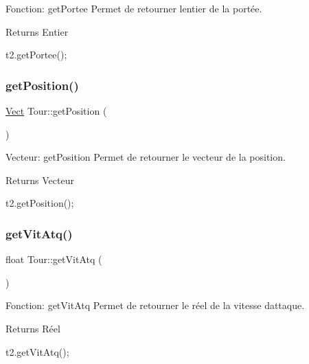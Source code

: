 Fonction\+: get\+Portee Permet de retourner l\textquotesingle{}entier de la portée. 

\begin{DoxyReturn}{Returns}
Entier 
\begin{DoxyCode}
t2.getPortee();
\end{DoxyCode}
 
\end{DoxyReturn}
\mbox{\label{classTour_a2283f61d6b088bf41c53c882f4a72864}} 
\subsubsection{\texorpdfstring{get\+Position()}{getPosition()}}
{\footnotesize\ttfamily \hyperlink{classVect}{Vect} Tour\+::get\+Position (\begin{DoxyParamCaption}{ }\end{DoxyParamCaption})}



Vecteur\+: get\+Position Permet de retourner le vecteur de la position. 

\begin{DoxyReturn}{Returns}
Vecteur 
\begin{DoxyCode}
t2.getPosition();
\end{DoxyCode}
 
\end{DoxyReturn}
\mbox{\label{classTour_a41fc157f749f571732100fa0daa1ad25}} 
\subsubsection{\texorpdfstring{get\+Vit\+Atq()}{getVitAtq()}}
{\footnotesize\ttfamily float Tour\+::get\+Vit\+Atq (\begin{DoxyParamCaption}{ }\end{DoxyParamCaption})}



Fonction\+: get\+Vit\+Atq Permet de retourner le réel de la vitesse d\textquotesingle{}attaque. 

\begin{DoxyReturn}{Returns}
Réel 
\begin{DoxyCode}
t2.getVitAtq();
\end{DoxyCode}
 
\end{DoxyReturn}
\mbox{\label{classTour_a7f9a17a8138ebd8afe72520d7d8a18db}} 
